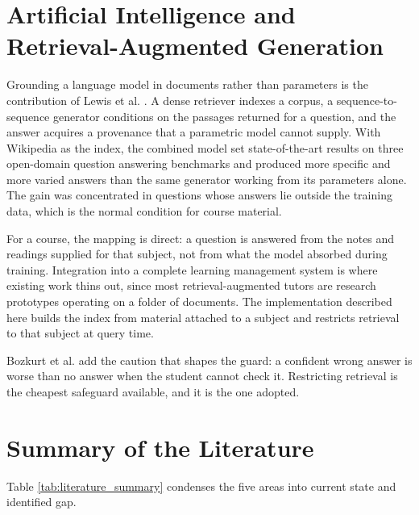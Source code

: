 \section{Artificial Intelligence and Retrieval-Augmented Generation}

Grounding a language model in documents rather than parameters is the contribution of Lewis et al. \cite{lewis2020retrieval}. A dense retriever indexes a corpus, a sequence-to-sequence generator conditions on the passages returned for a question, and the answer acquires a provenance that a parametric model cannot supply. With Wikipedia as the index, the combined model set state-of-the-art results on three open-domain question answering benchmarks and produced more specific and more varied answers than the same generator working from its parameters alone. The gain was concentrated in questions whose answers lie outside the training data, which is the normal condition for course material.

For a course, the mapping is direct: a question is answered from the notes and readings supplied for that subject, not from what the model absorbed during training. Integration into a complete learning management system is where existing work thins out, since most retrieval-augmented tutors are research prototypes operating on a folder of documents. The implementation described here builds the index from material attached to a subject and restricts retrieval to that subject at query time.

Bozkurt et al. \cite{bozkurt2023speculative} add the caution that shapes the guard: a confident wrong answer is worse than no answer when the student cannot check it. Restricting retrieval is the cheapest safeguard available, and it is the one adopted.

\section{Summary of the Literature}

Table \ref{tab:literature_summary} condenses the five areas into current state and identified gap.

